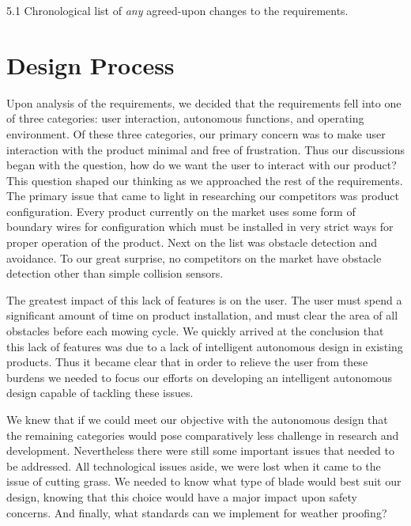 \documentclass[12pt,letterpaper]{article}
\begin{document}
5.1 Chronological list of \textit{any} agreed-upon changes to the requirements.

\section{Design Process}

Upon analysis of the requirements, we decided that the requirements fell into
one of three categories:  user interaction, autonomous functions, and operating
environment.  Of these three categories, our primary concern was to make user
interaction with the product minimal and free of frustration.  Thus our
discussions began with the question, how do we want the user to interact with
our product?  This question shaped our thinking as we approached the rest of the
requirements.  The primary issue that came to light in researching our
competitors was product configuration.  Every product currently on the market
uses some form of boundary wires for configuration which must be installed in
very strict ways for proper operation of the product.  Next on the list was
obstacle detection and avoidance.  To our great surprise, no competitors on the
market have obstacle detection other than simple collision sensors.

The greatest impact of this lack of features is on the user.  The user must
spend a significant amount of time on product installation, and must clear the
area of all obstacles before each mowing cycle.  We quickly arrived at the
conclusion that this lack of features was due to a lack of intelligent
autonomous design in existing products.  Thus it became clear that in order to
relieve the user from these burdens we needed to focus our efforts on developing
 an intelligent autonomous design capable of tackling these issues.

We knew that if we could meet our objective with the autonomous design that the
remaining categories would pose comparatively less challenge in research and
development.  Nevertheless there were still some important issues that needed to
be addressed. All technological issues aside, we were lost when it came to the
issue of cutting grass.  We needed to know what type of blade would best suit
our design, knowing that this choice would have a major impact upon safety
concerns.  And finally, what standards can we implement for weather proofing?
\end{document}
